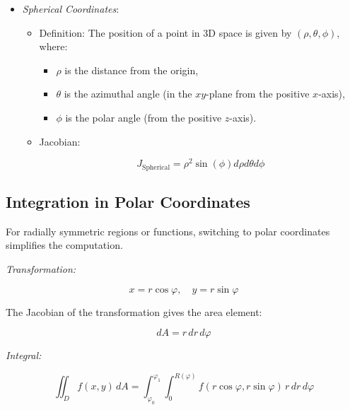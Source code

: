 \begin{itemize}
    \item \emph{Spherical Coordinates}:
    
    \begin{itemize}
        
        \item Definition: The position of a point in 3D space is given by \((\rho, \theta, \phi)\), where:
        
        \begin{itemize}
            
            \item \(\rho\) is the distance from the origin,
            
            \item \(\theta\) is the azimuthal angle (in the \(xy\)-plane from the positive \(x\)-axis),
            
            \item \(\phi\) is the polar angle (from the positive \(z\)-axis).
        
        \end{itemize}
        
        \item Jacobian:
               
              \[
                    J_{\text{Spherical}} = \rho^2 \sin (\phi) d\rho d\theta d\phi
              \]
            
    \end{itemize}

\end{itemize}

\subsection{Integration in Polar Coordinates}

For radially symmetric regions or functions, switching to polar coordinates simplifies the computation.

\emph{Transformation:}

\[
    x = r \cos \varphi, \quad y = r \sin \varphi
\]

The Jacobian of the transformation gives the area element:

\[
    dA = r\, dr\, d\varphi
\]

\emph{Integral:}

\[
    \iint_D f(x, y)\, dA = \int_{\varphi_0}^{\varphi_1} \int_{0}^{R(\varphi)} f(r \cos \varphi, r 
    \sin \varphi)\, r\, dr\, d\varphi
\]

